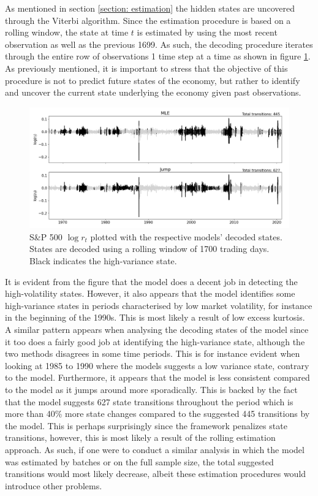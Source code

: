 As mentioned in section \ref{section: estimation} the hidden states are uncovered through the Viterbi algorithm. Since the estimation procedure is based on a rolling window, the state at time $t$ is estimated by using the most recent observation as well as the previous 1699. As such, the decoding procedure iterates through the entire row of observations 1 time step at a time as shown in figure \ref{fig:stylized_facts_decoded_states}. As previously mentioned, it is important to stress that the objective of this procedure is not to predict future states of the economy, but rather to identify and uncover the current state underlying the economy given past observations. 

\begin{figure}[H] 
    \centering
    \includegraphics[width=1.0\textwidth]{analysis/stylized_facts/images/decoded_states.png}
    \caption[S\&P 500 $\log r_t$ plotted with the respective models' decoded states]{S\&P 500 $\log r_t$ plotted with the respective models' decoded states. States are decoded using a rolling window of 1700 trading days. Black indicates the high-variance state.}
    \label{fig:stylized_facts_decoded_states} 
\end{figure}

It is evident from the figure that the \mle model does a decent job in detecting the high-volatility states. However, it also appears that the model identifies some high-variance states in periods characterised by low market volatility, for instance in the beginning of the 1990s. This is most likely a result of low excess kurtosis. A similar pattern appears when analysing the decoding states of the \jump model since it too does a fairly good job at identifying the high-variance state, although the two methods disagrees in some time periods. This is for instance evident when looking at 1985 to 1990 where the \mle models suggests a low variance state, contrary to the \jump model. Furthermore, it appears that the \jump model is less consistent compared to the \mle model as it jumps around more sporadically. This is backed by the fact that the \jump model suggests 627 state transitions throughout the period which is more than 40\% more state changes compared to the suggested 445 transitions by the \mle model. This is perhaps surprisingly since the \jump framework penalizes state transitions, however, this is most likely a result of the rolling estimation approach. As such, if one were to conduct a similar analysis in which the \jump model was estimated by batches or on the full sample size, the total suggested transitions would most likely decrease, albeit these estimation procedures would introduce other problems. 

